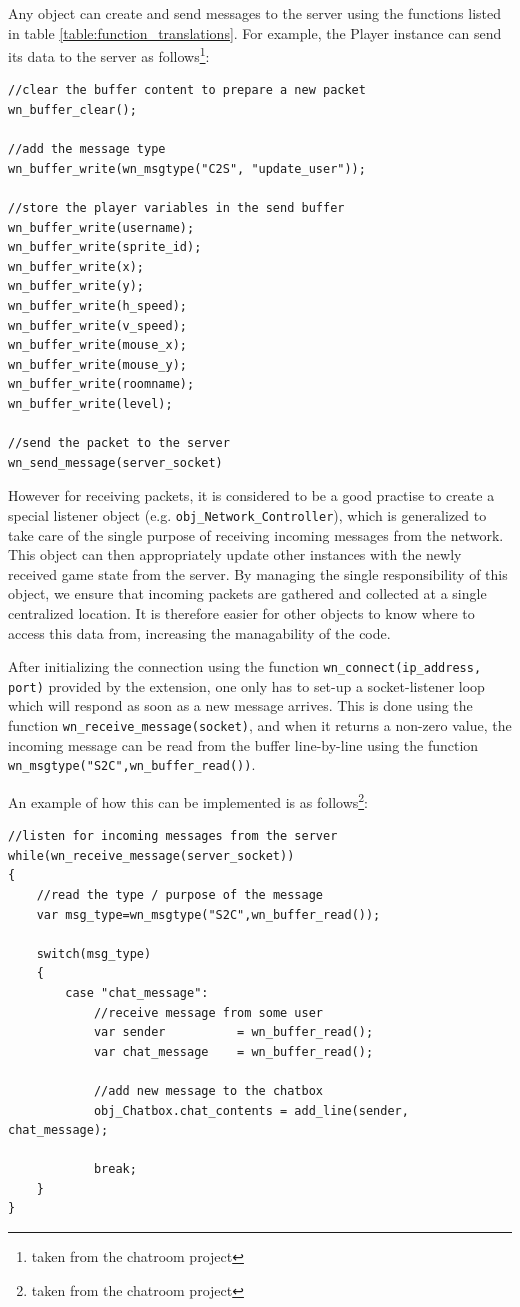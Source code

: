 \documentclass[bsc, 12pt, twoside, singlespacing, parskip, abbrevs, notimes, normalheadings, logo, deptreport]{styles/infthesis}
\begin{document}
Any object can create and send messages to the server using the functions listed in table \ref{table:function_translations}. For example, the Player instance can send its data to the server as follows\footnote{taken from the chatroom project}:
\begin{verbatim}
//clear the buffer content to prepare a new packet
wn_buffer_clear();

//add the message type
wn_buffer_write(wn_msgtype("C2S", "update_user"));

//store the player variables in the send buffer
wn_buffer_write(username);
wn_buffer_write(sprite_id);
wn_buffer_write(x);
wn_buffer_write(y);
wn_buffer_write(h_speed);
wn_buffer_write(v_speed);
wn_buffer_write(mouse_x);
wn_buffer_write(mouse_y);
wn_buffer_write(roomname);
wn_buffer_write(level);

//send the packet to the server
wn_send_message(server_socket)     
\end{verbatim}

However for receiving packets, it is considered to be a good practise to create a special listener object (e.g. \texttt{obj\_Network\_Controller}), which is generalized to take care of the single purpose of receiving incoming messages from the network. This object can then appropriately update other instances with the newly received game state from the server. By managing the single responsibility of this object, we ensure that incoming packets are gathered and collected at a single centralized location. It is therefore easier for other objects to know where to access this data from, increasing the managability of the code.

After initializing the connection using the function \texttt{wn\_connect(ip\_address, port)} provided by the extension, one only has to set-up a socket-listener loop which will respond as soon as a new message arrives. This is done using the function \texttt{wn\_receive\_message(socket)}, and when it returns a non-zero value, the incoming message can be read from the buffer line-by-line using the function \texttt{wn\_msgtype("S2C",wn\_buffer\_read())}.

An example of how this can be implemented is as follows\footnote{taken from the chatroom project}:
\begin{verbatim}
//listen for incoming messages from the server
while(wn_receive_message(server_socket))
{
	//read the type / purpose of the message
	var msg_type=wn_msgtype("S2C",wn_buffer_read());
	
	switch(msg_type)
	{
		case "chat_message":
			//receive message from some user
			var sender          = wn_buffer_read();
			var chat_message    = wn_buffer_read();
			
			//add new message to the chatbox
			obj_Chatbox.chat_contents = add_line(sender, chat_message);
			
			break;
	}
}
\end{verbatim}
\end{document}
